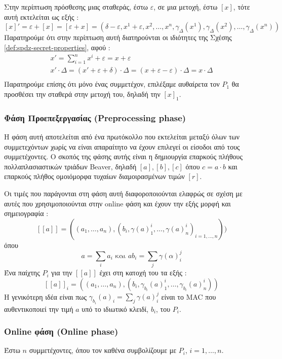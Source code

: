 Στην περίπτωση πρόσθεσης μιας σταθεράς, έστω $ε$, σε μια μετοχή, έστω $[x]$, τότε αυτή εκτελείται ως εξής :
\[
    [x]' = ε+[x] = [ε + x] = (δ-ε, x^1+ε, x^2, \ldots, x^n, γ_Δ(x^1), γ_Δ(x^2), \ldots, γ_Δ(x^n))
\]
Παρατηρούμε ότι στην περίπτωση αυτή διατηρούνται οι ιδιότητες της Σχέσης \ref{def:spdz-secret-properties}, αφού :
\begin{equation}
    \begin{gathered}
    x'=\sum_{i=1}^n x^{i} + ε = x+ε\\
    x' \cdot Δ = (x'+ ε + δ) \cdot Δ = (x + ε - ε) \cdot Δ = x \cdot Δ\\
    \end{gathered}
\end{equation}
Παρατηρούμε επίσης ότι μόνο ένας συμμετέχον, επιλέξαμε αυθαίρετα τον $P_1$ θα προσθέσει την σταθερά στην μετοχή του, δηλαδή την $[x]_1$.
\subsubsection{Φάση Προεπεξεργασίας (Preprocessing phase)}

Η φάση αυτή αποτελείται από ένα πρωτόκολλο που εκτελείται μεταξύ όλων των συμμετεχόντων χωρίς να είναι απαραίτητο να έχουν επιλεγεί οι είσοδοι από τους συμμετέχοντες. Ο σκοπός της φάσης αυτής είναι η δημιουργία επαρκούς πλήθους πολλαπλασιαστικών τριάδων Beaver, δηλαδή $[a], [b], [c]$ όπου $c = a \cdot b$ και επαρκούς πλήθος ομοιόμορφα τυχαίων διαμοιρασμένων τιμών $[r]$.

Οι τιμές που παράγονται στη φάση αυτή διαφοροποιούνται ελαφρώς σε σχέση με αυτές που χρησιμοποιούνται στην online φάση και έχουν την εξής μορφή και σημειογραφία :
\[
[[ a ]]=((a_1, \ldots, a_n),(b_i, γ(a)_1^i, \ldots, γ(a)_n^i)_{i=1, \ldots, n}))
\]
όπου
\[
    a = \sum_i a_i \text{ και } ab_i = \sum_j γ(α)_i^j
\]
Ένα παίχτης $P_i$ για την $[[a]]$ έχει στη κατοχή του τα εξής :
\[
    [[a]]_i = ((a_1, \ldots, a_n), (b_i, γ_{b_i}(a)_1^i, \ldots, γ_{b_i}(a)_n^i))
\]
Η γενικότερη ιδέα είναι πως $γ_{b_i}(a)_i = \sum_jγ(a)_i^j$ είναι το MAC που αυθεντικοποιεί την τιμή $a$ υπό το ιδιωτικό κλειδί, $b_i$, του $P_i$.

\subsubsection{Online φάση (Online phase)}

Έστω $n$ συμμετέχοντες, όπου τον καθένα συμβολίζουμε με $P_i$, $i=1, \ldots, n$.

